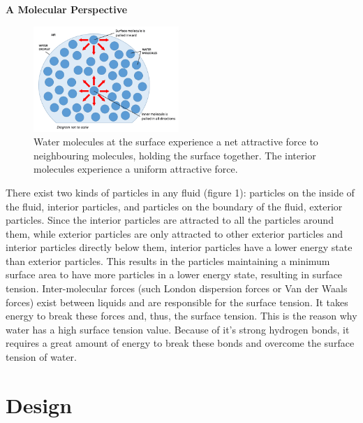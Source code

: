 \documentclass{article}
\begin{document}
\par{\large \textbf{A Molecular Perspective}}

\begin{figure}[!h]
\centering
\includegraphics[width=5.5cm]{Surface tension.png}
\caption{Water molecules at the surface experience a net attractive force to neighbouring molecules, holding the surface together. The interior molecules experience a uniform attractive force.\protect\footnotemark{}}\label{wrap-fig:1}
\end{figure} 


\par {There exist two kinds of particles in any fluid (figure 1): particles on the inside of the fluid, interior particles, and particles on the boundary of the fluid, exterior particles. Since the interior particles are attracted to all the particles around them, while exterior particles are only attracted to other exterior particles and interior particles directly below them, interior particles have a lower energy state than exterior particles. This results in the particles maintaining a minimum surface area to have more particles in a lower energy state, resulting in surface tension. Inter-molecular forces (such London dispersion forces or Van der Waals forces) exist between liquids and are responsible for the surface tension. It takes energy to break these forces and, thus, the surface tension. This is the reason why water has a high surface tension value. Because of it's strong hydrogen bonds, it requires a great amount of energy to break these bonds and overcome the surface tension of water.}

\section{Design}
\end{document}
